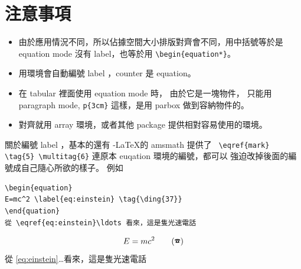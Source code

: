 \section{注意事項}
\begin{itemize}
  \item 由於應用情況不同，所以佔據空間大小排版對齊會不同，用中括號等於是
    equation mode 沒有 label，也等於用 \verb=\begin{equation*}=。
  \item 用環境會自動編號 label ，counter 是 equation。
  \item 在 tabular 裡面使用 equation mode 時， 由於它是一塊物件， 只能用
    paragraph mode, \verb|p{3cm}| 這樣，是用 parbox 做到容納物件的。
  \item 對齊就用 array 環境，或者其他 package 提供相對容易使用的環境。
\end{itemize}
關於編號 label ，基本的還有 \AmS-\LaTeX 的 amsmath 提供了 
\verb| \eqref{mark} \tag{5} \multitag{6}| 連原本 euqation 環境的編號，都可以
強迫改掉後面的編號成自己隨心所欲的樣子。 例如
\begin{verbatim}
\begin{equation}
E=mc^2 \label{eq:einstein} \tag{\ding{37}}
\end{quation}
從 \eqref{eq:einstein}\ldots 看來，這是隻光速電話
\end{verbatim}
\begin{equation}
E=mc^2 \label{eq:einstein} \tag{\ding{37}}
\end{equation}
從 \eqref{eq:einstein}\ldots 看來，這是隻光速電話

